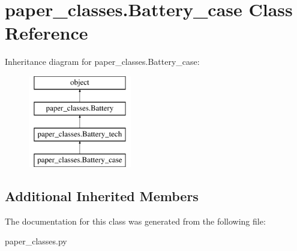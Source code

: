 \hypertarget{classpaper__classes_1_1_battery__case}{}\section{paper\+\_\+classes.\+Battery\+\_\+case Class Reference}
\label{classpaper__classes_1_1_battery__case}
Inheritance diagram for paper\+\_\+classes.\+Battery\+\_\+case\+:\begin{figure}[H]
\begin{center}
\leavevmode
\includegraphics[height=4.000000cm]{classpaper__classes_1_1_battery__case}
\end{center}
\end{figure}
\subsection*{Additional Inherited Members}


The documentation for this class was generated from the following file\+:\begin{DoxyCompactItemize}
\item 
paper\+\_\+classes.\+py\end{DoxyCompactItemize}
